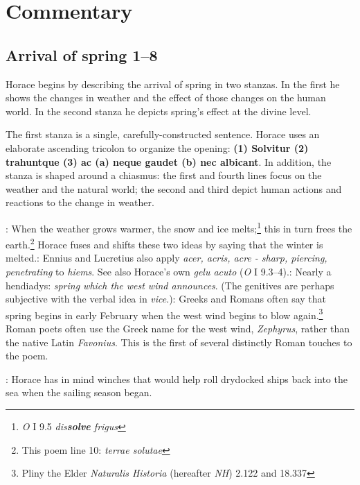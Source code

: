 \chapter*{Commentary}

\section*{Arrival of spring 1--8}

Horace begins by describing the arrival of spring in two stanzas.  In the first he shows the changes in weather and the effect of those changes on the human world.  In the second stanza he depicts spring's effect at the divine level.


The first stanza is a single, carefully-constructed sentence.  Horace uses an elaborate ascending tricolon to organize the opening: \textbf{(1) Solvitur \lips (2) trahuntque \lips (3) ac (a) neque \lips gaudet \lips (b) nec \lips albicant}.  In addition, the stanza is shaped around a chiasmus: the first and fourth lines focus on the weather and the natural world; the second and third depict human actions and reactions to the change in weather. 


: When the weather grows warmer, the snow and ice melts;\footnote{\textit{O} I 9.5 \textit{dis\textbf{solve} frigus}} this in turn frees the earth.\footnote{This poem line 10: \textit{terrae \lips solutae}}  Horace fuses and shifts these two ideas by saying that the winter is melted.\indent{}: Ennius and Lucretius also apply \textit{acer, acris, acre - sharp, piercing, penetrating} to \textit{hiems}. See also Horace's own \textit{gelu \lips acuto} (\textit{O} I 9.3--4).\indent{}: Nearly a hendiadys: \textit{spring which the west wind announces}.  (The genitives are perhaps subjective with the verbal idea in \textit{vice}.)\indent{}: Greeks and Romans often say that spring begins in early February when the west wind begins to blow again.\footnote{Pliny the Elder \textit{Naturalis Historia} (hereafter \textit{NH}) 2.122 and 18.337}  Roman poets often use the Greek name for the west wind, \textit{Zephyrus}, rather than the native Latin \textit{Favonius}.  This is the first of several distinctly Roman touches to the poem.


: Horace has in mind winches that would help roll drydocked ships back into the sea when the sailing season began.

